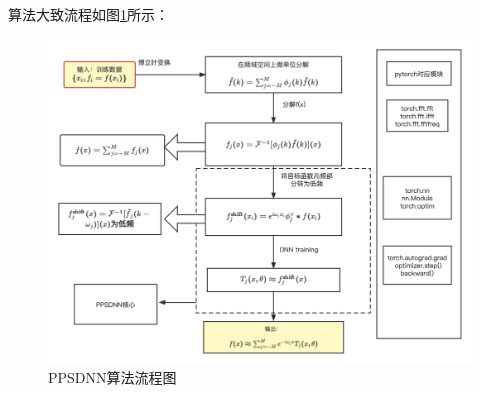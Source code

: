 算法大致流程如图\ref{ppsdnnchart}所示：
\begin{figure}[htbp]
    \centering
    \includegraphics[width=0.95\linewidth]{figures/ppsdnnchart.pdf}
    \caption{PPSDNN算法流程图}
    \label{ppsdnnchart}
\end{figure}



